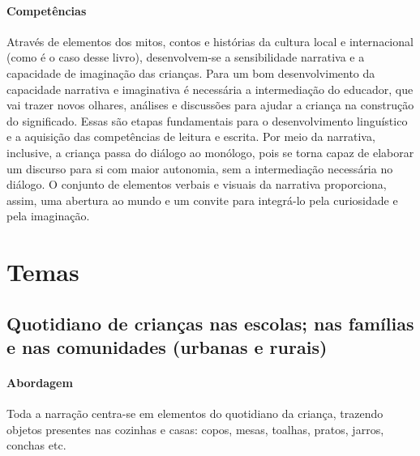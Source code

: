\documentclass[11pt]{extarticle}
\begin{document}
\paragraph{Competências} 
Através de elementos dos mitos, contos e histórias da cultura local e internacional (como é o caso desse livro), desenvolvem-se a sensibilidade narrativa e a capacidade de imaginação das crianças. Para um bom desenvolvimento da capacidade narrativa e imaginativa é necessária a intermediação do educador, que vai trazer novos olhares, análises e discussões para ajudar a criança na construção do significado. Essas são etapas fundamentais para o desenvolvimento linguístico e a aquisição das competências de leitura e escrita. Por meio da narrativa, inclusive, a criança passa do diálogo ao monólogo, pois se torna capaz de elaborar um discurso para si com maior autonomia, sem a intermediação necessária no diálogo.
O conjunto de elementos verbais e visuais da narrativa proporciona, assim,
uma abertura ao mundo e um convite para integrá-lo pela curiosidade e pela imaginação.


\section{Temas}

\subsection{Quotidiano de crianças nas escolas; nas famílias e nas comunidades (urbanas e rurais)}

\paragraph{Abordagem} Toda a narração centra-se em elementos do quotidiano da criança, trazendo objetos presentes nas cozinhas e casas: copos, mesas, toalhas, pratos, jarros, conchas etc.

\end{document}
